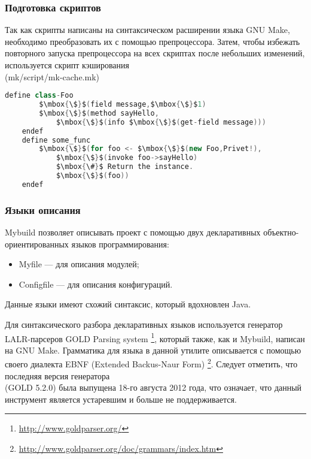 \subsubsection{Подготовка скриптов}
Так как скрипты написаны на синтаксическом расширении языка GNU Make, необходимо преобразовать их с помощью препроцессора. Затем, чтобы избежать повторного запуска препроцессора на всех скриптах после небольших изменений, используется скрипт кэширования \\(mk/script/mk-cache.mk)
\begin{lstlisting}[caption=Пример определения класса, language=Java, frame=single, breaklines, mathescape]
    define class-Foo
        $\mbox{\$}$(field message,$\mbox{\$}$1)
        $\mbox{\$}$(method sayHello,
            $\mbox{\$}$(info $\mbox{\$}$(get-field message)))
    endef
    define some_func
        $\mbox{\$}$(for foo <- $\mbox{\$}$(new Foo,Privet!),
            $\mbox{\$}$(invoke foo->sayHello)
            $\mbox{\#}$ Return the instance.
            $\mbox{\$}$(foo))
    endef
\end{lstlisting}

\subsubsection{Языки описания}
Mybuild позволяет описывать проект с помощью двух декларативных объектно-ориентированных языков программирования:
\begin{itemize}
	\item Myfile --- для описания модулей;
	\item Configfile --- для описания конфигураций.
\end{itemize}
Данные языки имеют схожий синтаксис, который вдохновлен Java.

Для синтаксического разбора декларативных языков используется генератор LALR-парсеров \cite{10.5555/1951778} GOLD Parsing system \footnote{\href{http://www.goldparser.org/}{http://www.goldparser.org/}}, который также, как и Mybuild, написан на GNU Make. Грамматика для языка в данной утилите описывается с помощью своего диалекта EBNF (Extended Backus-Naur Form) \footnote {\href{http://www.goldparser.org/doc/grammars/index.htm}{http://www.goldparser.org/doc/grammars/index.htm}}. Следует отметить, что последняя версия генератора \\ (GOLD 5.2.0) была выпущена 18-го августа 2012 года, что означает, что данный инструмент является устаревшим и больше не поддерживается.

